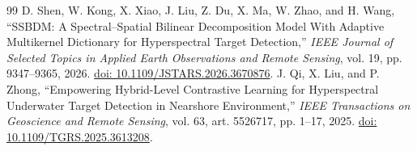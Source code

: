 \documentclass[a4paper,11pt]{article}
\begin{document}
\begin{thebibliography}{99}
 D. Shen, W. Kong, X. Xiao, J. Liu, Z. Du, X. Ma, W. Zhao, and H. Wang, ``SSBDM: A Spectral--Spatial Bilinear Decomposition Model With Adaptive Multikernel Dictionary for Hyperspectral Target Detection,'' \emph{IEEE Journal of Selected Topics in Applied Earth Observations and Remote Sensing}, vol. 19, pp. 9347--9365, 2026. \href{https://doi.org/10.1109/JSTARS.2026.3670876}{doi: 10.1109/JSTARS.2026.3670876}.
 J. Qi, X. Liu, and P. Zhong, ``Empowering Hybrid-Level Contrastive Learning for Hyperspectral Underwater Target Detection in Nearshore Environment,'' \emph{IEEE Transactions on Geoscience and Remote Sensing}, vol. 63, art. 5526717, pp. 1--17, 2025. \href{https://doi.org/10.1109/TGRS.2025.3613208}{doi: 10.1109/TGRS.2025.3613208}.
\end{thebibliography}
\endgroup
\end{document}
